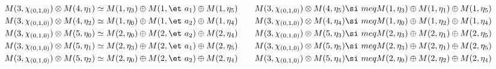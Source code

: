 \begin{align*}
M(3,\chi_{(0,1,0)}) &\otimes M(4,\eta_{1}) \simeq M(1,\eta_{3}) \oplus M(1,\et\
a_{1}) \oplus M(1,\eta_{5}) &&& M(3,\chi_{(0,1,0)}) &\otimes M(4,\eta_{5}) \si\
meq M(1,\eta_{3}) \oplus M(1,\eta_{1}) \oplus M(1,\eta_{5})\\
M(3,\chi_{(0,1,0)}) &\otimes M(4,\eta_{2}) \simeq M(1,\eta_{0}) \oplus M(1,\et\
a_{2}) \oplus M(1,\eta_{4}) &&& M(3,\chi_{(0,1,0)}) &\otimes M(4,\eta_{4}) \si\
meq M(1,\eta_{0}) \oplus M(1,\eta_{2}) \oplus M(1,\eta_{4})\\
M(3,\chi_{(0,1,0)}) &\otimes M(5,\eta_{0}) \simeq M(2,\eta_{0}) \oplus M(2,\et\
a_{2}) \oplus M(2,\eta_{4}) &&& M(3,\chi_{(0,1,0)}) &\otimes M(5,\eta_{3}) \si\
meq M(2,\eta_{3}) \oplus M(2,\eta_{1}) \oplus M(2,\eta_{5})\\
M(3,\chi_{(0,1,0)}) &\otimes M(5,\eta_{1}) \simeq M(2,\eta_{3}) \oplus M(2,\et\
a_{1}) \oplus M(2,\eta_{5}) &&& M(3,\chi_{(0,1,0)}) &\otimes M(5,\eta_{5}) \si\
meq M(2,\eta_{3}) \oplus M(2,\eta_{1}) \oplus M(2,\eta_{5})\\
M(3,\chi_{(0,1,0)}) &\otimes M(5,\eta_{2}) \simeq M(2,\eta_{0}) \oplus M(2,\et\
a_{2}) \oplus M(2,\eta_{4}) &&& M(3,\chi_{(0,1,0)}) &\otimes M(5,\eta_{4}) \si\
meq M(2,\eta_{0}) \oplus M(2,\eta_{2}) \oplus M(2,\eta_{4})\\
\end{align*}

